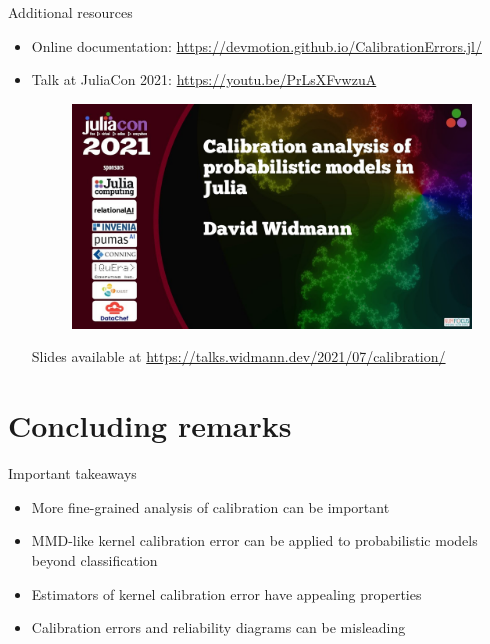 \documentclass[aspectratio=169,hyperref={pdfpagelabels=false,pageanchor=false,bookmarks=false}]{beamer}
\begin{document}
\begin{frame}{Additional resources}
  \begin{itemize}
    \item Online documentation: \url{https://devmotion.github.io/CalibrationErrors.jl/}
    \item Talk at JuliaCon 2021: \url{https://youtu.be/PrLsXFvwzuA}
          \begin{figure}
            \centering
            \includegraphics[height=0.5\textheight]{figures/youtube.jpg}
          \end{figure}
          Slides available at \url{https://talks.widmann.dev/2021/07/calibration/}
  \end{itemize}
\end{frame}

\section{Concluding remarks}
\frame{\sectionpage}

\begin{frame}{Important takeaways}
  \begin{itemize}
    \item More fine-grained analysis of calibration can be important
    \item MMD-like kernel calibration error can be applied to probabilistic models beyond classification
    \item Estimators of kernel calibration error have appealing properties
    \item Calibration errors and reliability diagrams can be misleading
  \end{itemize}
\end{frame}
\end{document}

